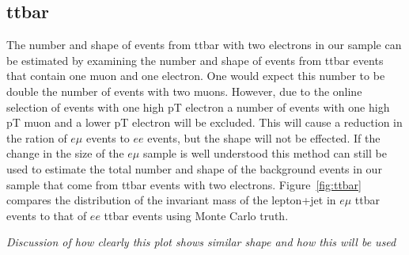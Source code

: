 \documentclass{cmspaper}
\begin{document}
\subsection{ttbar}

The number and shape of events from ttbar with two electrons in our sample can be estimated by examining the number and shape of events from ttbar events that contain one muon and one electron.  One would expect this number to be double the number of events with two muons.  However, due to the online selection of events with one high pT electron a number of events with one high pT muon and a lower pT electron will be excluded.  This will cause a reduction in the ration of $e\mu$ events to $ee$ events, but the shape will not be effected.  If the change in the size of the $e\mu$ sample is well understood this method can still be used to estimate the total number and shape of the background events in our sample that come from ttbar events with two electrons.  Figure~\ref{fig:ttbar} compares the distribution of the invariant mass of the lepton+jet in $e\mu$ ttbar events to that of $ee$ ttbar events using Monte Carlo truth.

{\sl Discussion of how clearly this plot shows similar shape and how this will be used}
\end{document}
